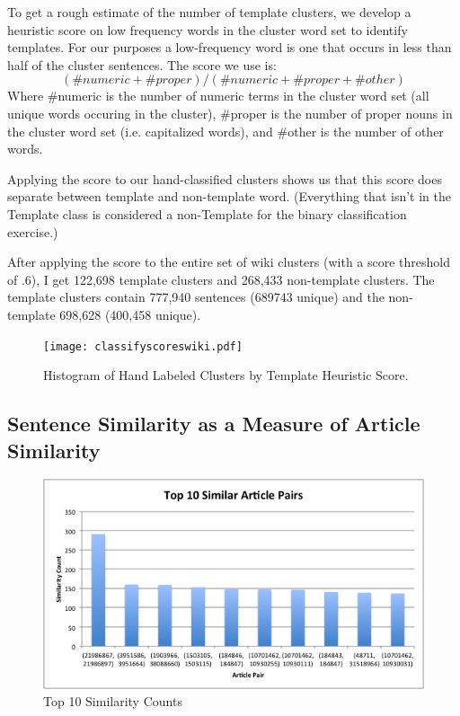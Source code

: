 \documentclass{acm_proc_article-sp}
\begin{document}
To get a rough estimate of the number of template clusters, we develop a heuristic score on low frequency words in the cluster word set to identify templates. For our purposes a low-frequency word is one that occurs in less than half of the cluster sentences. The score we use is:
\[(\#numeric + \#proper)/(\#numeric + \#proper + \#other)\]
Where \#numeric is the number of numeric terms in the cluster word set (all unique words occuring in the cluster), \#proper is the number of proper nouns in the cluster word set (i.e. capitalized words), and \#other is the number of other words.

Applying the score to our hand-classified clusters shows us that this score does separate between template and non-template word. (Everything that isn't in the Template class is considered a non-Template for the binary classification exercise.)

After applying the score to the entire set of wiki clusters (with a score threshold of .6), I get 122,698 template clusters and 268,433 non-template clusters. The template clusters contain 777,940 sentences (689743 unique) and the non-template 698,628 (400,458 unique). 

\begin{figure}
\centering
\texttt{[image: classifyscoreswiki.pdf]}
\caption{Histogram of Hand Labeled Clusters by Template Heuristic Score.}
\label{heuristic}
\end{figure}


\subsection{Sentence Similarity as a Measure of Article Similarity}

\begin{figure}
\begin{center}
\includegraphics[scale=0.43, keepaspectratio = true]{Top10ArticlePairs.jpg}
\end{center}
\caption{Top 10 Similarity Counts}
\label{toparticles}
\end{figure}
\end{document}
